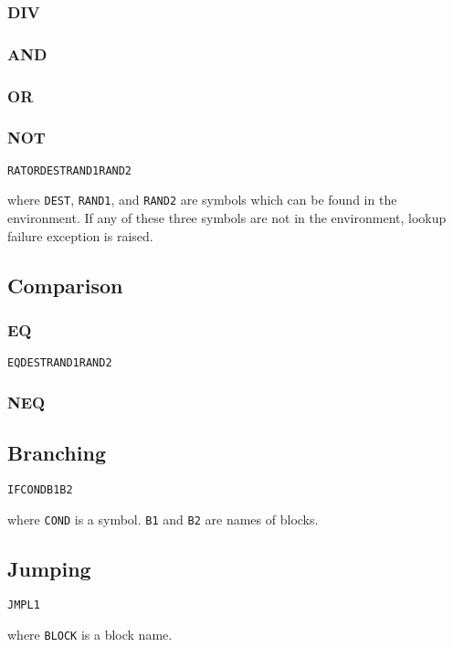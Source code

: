 \documentclass{note}
\begin{document}
\subsubsection{DIV}
\subsubsection{AND}
\subsubsection{OR}
\subsubsection{NOT}

\begin{alltt}
  RATOR DEST RAND1 RAND2
\end{alltt}
where {\tt DEST}, {\tt RAND1}, and {\tt RAND2} are symbols which can be found
in the environment.
If any of these three symbols are not in the environment, lookup failure 
exception is raised.

\subsection{Comparison}
\subsubsection{EQ}
\begin{alltt}
  EQ DEST RAND1 RAND2
\end{alltt}
\subsubsection{NEQ}

\subsection{Branching}
\begin{alltt}
  IF COND B1 B2
\end{alltt}
where {\tt COND} is a symbol. {\tt{}B1} and {\tt{}B2} are names of blocks.

\subsection{Jumping}
\begin{alltt}
  JMP L1
\end{alltt}
where {\tt BLOCK} is a block name.
\end{document}
